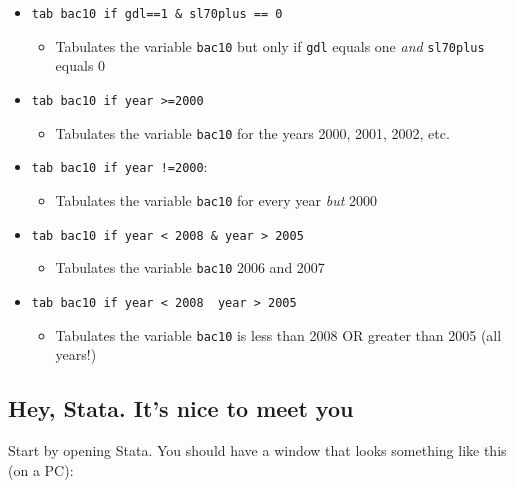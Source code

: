 \documentclass[
]{article}
\providecommand{\tightlist}{%
  \setlength{\itemsep}{0pt}\setlength{\parskip}{0pt}}
\begin{document}
\begin{itemize}
\tightlist
\item
  \texttt{tab\ bac10\ if\ gdl==1\ \&\ sl70plus\ ==\ 0}

  \begin{itemize}
  \tightlist
  \item
    Tabulates the variable \texttt{bac10} but only if \texttt{gdl}
    equals one \emph{and} \texttt{sl70plus} equals 0
  \end{itemize}
\item
  \texttt{tab\ bac10\ if\ year\ \textgreater{}=2000}

  \begin{itemize}
  \tightlist
  \item
    Tabulates the variable \texttt{bac10} for the years 2000, 2001,
    2002, etc.
  \end{itemize}
\item
  \texttt{tab\ bac10\ if\ year\ !=2000}:

  \begin{itemize}
  \tightlist
  \item
    Tabulates the variable \texttt{bac10} for every year \emph{but} 2000
  \end{itemize}
\item
  \texttt{tab\ bac10\ if\ year\ \textless{}\ 2008\ \&\ year\ \textgreater{}\ 2005}

  \begin{itemize}
  \tightlist
  \item
    Tabulates the variable \texttt{bac10} 2006 and 2007
  \end{itemize}
\item
  \texttt{tab\ bac10\ if\ year\ \textless{}\ 2008\ \textbar{}\ year\ \textgreater{}\ 2005}

  \begin{itemize}
  \tightlist
  \item
    Tabulates the variable \texttt{bac10} is less than 2008 OR greater
    than 2005 (all years!)
  \end{itemize}
\end{itemize}

\hypertarget{hey-stata.-its-nice-to-meet-you}{%
\subsection{Hey, Stata. It's nice to meet
you}\label{hey-stata.-its-nice-to-meet-you}}

Start by opening Stata. You should have a window that looks something
like this (on a PC):
\end{document}
